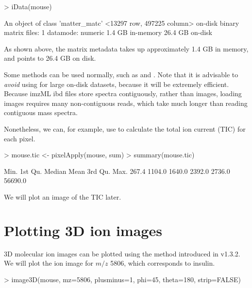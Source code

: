 \documentclass[a4paper]{article}
\begin{document}
\begin{Schunk}
\begin{Sinput}
> iData(mouse)
\end{Sinput}
\begin{Soutput}
An object of class 'matter_matc'
  <13297 row, 497225 column> on-disk binary matrix
    files: 1
    datamode: numeric
    1.4 GB in-memory
    26.4 GB on-disk
\end{Soutput}
\end{Schunk}

As shown above, the matrix metadata takes up approximately 1.4 GB in memory, and points to 26.4 GB on disk.

Some  methods can be used normally, such as  and . Note that it is advisable to \textit{avoid} using  for large on-disk datasets, because it will be extremely efficient. Because imzML ibd files store spectra contiguously, rather than images, loading images requires many non-contiguous reads, which take much longer than reading contiguous mass spectra.

Nonetheless, we can, for example, use  to calculate the total ion current (TIC) for each pixel.

\begin{Schunk}
\begin{Sinput}
> mouse.tic <- pixelApply(mouse, sum)
> summary(mouse.tic)
\end{Sinput}
\begin{Soutput}
   Min. 1st Qu.  Median    Mean 3rd Qu.    Max. 
  267.4  1104.0  1640.0  2392.0  2736.0 56690.0 
\end{Soutput}
\end{Schunk}

We will plot an image of the TIC later.

\section{Plotting 3D ion images}

3D molecular ion images can be plotted using the  method introduced in  v1.3.2. We will plot the ion image for $m/z$ 5806, which corresponds to insulin.

\begin{Schunk}
\begin{Sinput}
> image3D(mouse, mz=5806, plusminus=1, phi=45, theta=180, strip=FALSE)
\end{Sinput}
\end{Schunk}
\end{document}
